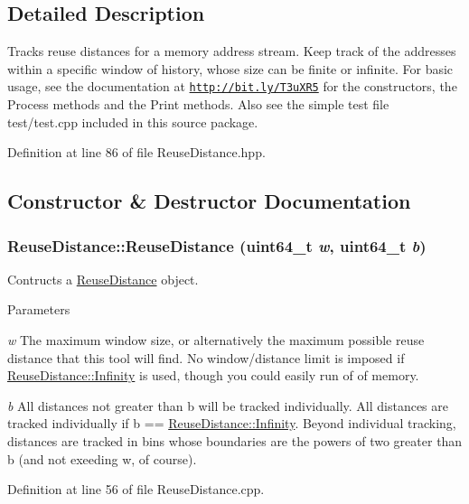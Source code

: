\subsection{Detailed Description}
Tracks reuse distances for a memory address stream. Keep track of the addresses within a specific window of history, whose size can be finite or infinite. For basic usage, see the documentation at \href{http://bit.ly/T3uXR5}{\tt http://bit.ly/T3uXR5} for the constructors, the Process methods and the Print methods. Also see the simple test file test/test.cpp included in this source package. 

Definition at line 86 of file ReuseDistance.hpp.



\subsection{Constructor \& Destructor Documentation}
\hypertarget{class_reuse_distance_a0248afa697da0f6c87c6fd30c289ecc6}{
\subsubsection[{ReuseDistance}]{\setlength{\rightskip}{0pt plus 5cm}ReuseDistance::ReuseDistance (uint64\_\-t {\em w}, \/  uint64\_\-t {\em b})}}
\label{class_reuse_distance_a0248afa697da0f6c87c6fd30c289ecc6}
Contructs a \hyperlink{class_reuse_distance}{ReuseDistance} object.


\begin{DoxyParams}{Parameters}
\item[{\em w}]The maximum window size, or alternatively the maximum possible reuse distance that this tool will find. No window/distance limit is imposed if \hyperlink{class_reuse_distance_a59f7f0ac6ad014472537619394ac7375}{ReuseDistance::Infinity} is used, though you could easily run of of memory. \item[{\em b}]All distances not greater than b will be tracked individually. All distances are tracked individually if b == \hyperlink{class_reuse_distance_a59f7f0ac6ad014472537619394ac7375}{ReuseDistance::Infinity}. Beyond individual tracking, distances are tracked in bins whose boundaries are the powers of two greater than b (and not exeeding w, of course). \end{DoxyParams}


Definition at line 56 of file ReuseDistance.cpp.

